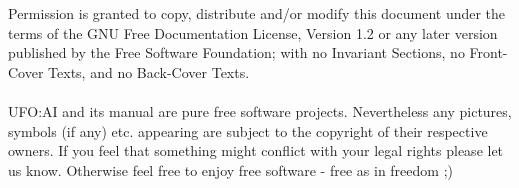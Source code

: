 



Permission is granted to copy, distribute and/or modify this document under the terms of the GNU Free Documentation License, Version 1.2 or any later version published by the Free Software Foundation; with no Invariant Sections, no Front-Cover Texts, and no Back-Cover Texts.\\
\\
UFO:AI and its manual are pure free software projects. Nevertheless any pictures, symbols (if any) etc. appearing are subject to the copyright of their respective owners. If you feel that something might conflict with your legal rights please let us know. Otherwise feel free to enjoy free software - free as in freedom ;) 

\maketitle
\newpage
\tableofcontents





\appendix


